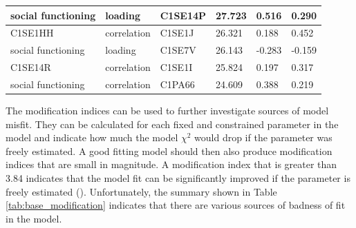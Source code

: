 \documentclass[11pt]{article}
\begin{document}
\begin{table}[h!]
{\begin{tabular}{|l|l|l|l|l|l|}
social functioning     & loading            & C1SE14P                  & 27.723                                                                & 0.516                                                                        & 0.290                                                                               \\ \hline
C1SE1HH                 & correlation        & C1SE1J                   & 26.321                                                                & 0.188                                                                        & 0.452                                                                               \\ \hline
social functioning     & loading            & C1SE7V                   & 26.143                                                                & -0.283                                                                       & -0.159                                                                              \\ \hline
C1SE14R                 & correlation        & C1SE1I                   & 25.824                                                                & 0.197                                                                        & 0.317                                                                               \\ \hline
social functioning     & correlation        & C1PA66                   & 24.609                                                                & 0.388                                                                        & 0.219                                                                               \\ \hline
\end{tabular}
}
\end{table}

The modification indices can be used to further investigate sources of model misfit.
They can be calculated for each fixed and constrained parameter in the model and indicate how much the model $\chi^2$ would drop if the parameter was freely estimated.
A good fitting model should then also produce modification indices that are small in magnitude.
A modification index that is greater than 3.84 indicates that the model fit can be significantly improved if the parameter is freely estimated (\cite{brown2015}).
Unfortunately, the summary shown in Table \ref{tab:base_modification} indicates that there are various sources of badness of fit in the model.
\end{document}
